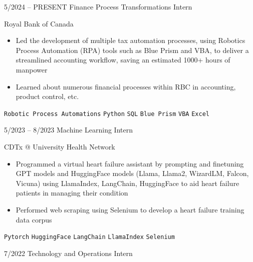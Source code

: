 \documentclass[9pt]{developercv} %
\begin{document}
\vspace{-10 pt}
\begin{entrylist}
    \entry
        {5/2024 -- PRESENT}
		{Finance Process Transformations Intern}
		{}
		{\vspace{-10pt}
  
       Royal Bank of Canada
        \vspace{5pt}
        \begin{itemize}[noitemsep,topsep=0pt,parsep=0pt,partopsep=0pt, leftmargin=-1pt]
            \item Led the development of multiple tax automation processes, using Robotics Process Automation (RPA) tools such as Blue Prism and VBA, to deliver a streamlined accounting workflow,  saving an estimated 1000+ hours of manpower
            \item Learned about numerous financial processes within RBC in accounting, product control, etc.
        \end{itemize} 
        \vspace{5pt}
        \texttt{Robotic Process Automations} \slashsep \texttt{Python} \slashsep \texttt{SQL} \slashsep \texttt{Blue Prism} \slashsep \texttt{VBA} \slashsep \texttt{Excel}}
	\entry
        {5/2023 -- 8/2023}
		{Machine Learning Intern}
		{}
		{\vspace{-10pt}
  
        CDTx @ University Health Network
        \vspace{5pt}
        \begin{itemize}[noitemsep,topsep=0pt,parsep=0pt,partopsep=0pt, leftmargin=-1pt]
            \item Programmed a virtual heart failure assistant by prompting and finetuning GPT models and HuggingFace models (Llama, Llama2, WizardLM, Falcon, Vicuna) using LlamaIndex, LangChain, HuggingFace to aid heart failure patients in managing their condition
            \item Performed web scraping using Selenium to develop a heart failure training data corpus
        \end{itemize} 
        \vspace{5pt}
        \texttt{Pytorch} \slashsep \texttt{HuggingFace} \slashsep \texttt{LangChain} \slashsep \texttt{LlamaIndex} \slashsep \texttt{Selenium}}
        \entry
        {7/2022}
		{Technology and Operations Intern}
		{}
		{\vspace{-10pt}
  
}
\end{entrylist}
\end{document}
